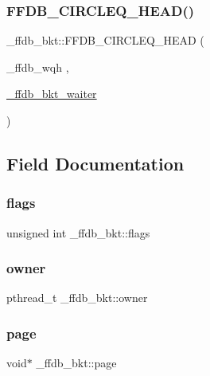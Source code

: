 \subsubsection{\texorpdfstring{FFDB\_CIRCLEQ\_HEAD()}{FFDB\_CIRCLEQ\_HEAD()}}
{\footnotesize\ttfamily \+\_\+ffdb\+\_\+bkt\+::\+F\+F\+D\+B\+\_\+\+C\+I\+R\+C\+L\+E\+Q\+\_\+\+H\+E\+AD (\begin{DoxyParamCaption}\item[{\+\_\+ffdb\+\_\+wqh}]{,  }\item[{\mbox{\hyperlink{struct__ffdb__bkt__waiter}{\+\_\+ffdb\+\_\+bkt\+\_\+waiter}}}]{ }\end{DoxyParamCaption})}



\subsection{Field Documentation}
\mbox{\label{struct__ffdb__bkt_ab5210b13b17bfddd60495e09cce20e31}} 
\subsubsection{\texorpdfstring{flags}{flags}}
{\footnotesize\ttfamily unsigned int \+\_\+ffdb\+\_\+bkt\+::flags}

\mbox{\label{struct__ffdb__bkt_a7c745c3cbd09f67b3e5eef745ab4951f}} 
\subsubsection{\texorpdfstring{owner}{owner}}
{\footnotesize\ttfamily pthread\+\_\+t \+\_\+ffdb\+\_\+bkt\+::owner}

\mbox{\label{struct__ffdb__bkt_ad2fdc4f4409d93c8c67e8842c50d2077}} 
\subsubsection{\texorpdfstring{page}{page}}
{\footnotesize\ttfamily void$\ast$ \+\_\+ffdb\+\_\+bkt\+::page}

\mbox{\label{struct__ffdb__bkt_ab5accdaea39ef0c2afcbd420f46ff170}} 
